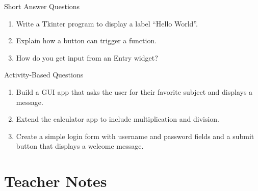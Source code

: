 \begin{exercise}{Short Answer Questions}
\begin{enumerate}
    \item Write a Tkinter program to display a label “Hello World”.  
    \item Explain how a button can trigger a function.  
    \item How do you get input from an Entry widget?  
\end{enumerate}
\end{exercise}

\begin{exercise}{Activity-Based Questions}
\begin{enumerate}
    \item Build a GUI app that asks the user for their favorite subject and displays a message.  
    \item Extend the calculator app to include multiplication and division.  
    \item Create a simple login form with username and password fields and a submit button that displays a welcome message.  
\end{enumerate}
\end{exercise}

\section{Teacher Notes}


